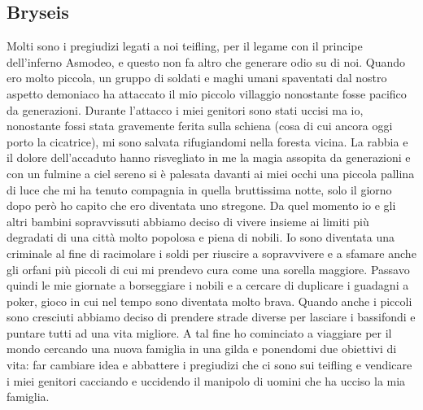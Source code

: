 \documentclass{article}
\begin{document}
          \subsection{Bryseis}Molti sono i pregiudizi legati a noi teifling, per il legame con il principe dell’inferno Asmodeo, e questo non fa altro che generare odio su di noi. Quando ero molto piccola, un gruppo di soldati e maghi umani spaventati dal nostro aspetto demoniaco ha attaccato il mio piccolo villaggio nonostante fosse pacifico da generazioni. Durante l’attacco i miei genitori sono stati uccisi ma io, nonostante fossi stata gravemente ferita sulla schiena (cosa di cui ancora oggi porto la cicatrice), mi sono salvata rifugiandomi nella foresta vicina. La rabbia e il dolore dell’accaduto hanno risvegliato in me la magia assopita da generazioni e con un fulmine a ciel sereno si è palesata davanti ai miei occhi una piccola pallina di luce che mi ha tenuto compagnia in quella bruttissima notte, solo il giorno dopo però ho capito che ero diventata uno stregone. Da quel momento io e gli altri bambini sopravvissuti abbiamo deciso di vivere insieme ai limiti più degradati di una città molto popolosa e piena di nobili. Io sono diventata una criminale al fine di racimolare i soldi per riuscire a sopravvivere e a sfamare anche gli orfani più piccoli di cui mi prendevo cura come una sorella maggiore. Passavo quindi le mie giornate a borseggiare i nobili e a cercare di duplicare i guadagni a poker, gioco in cui nel tempo sono diventata molto brava. Quando anche i piccoli sono cresciuti abbiamo deciso di prendere strade diverse per lasciare i bassifondi e puntare tutti ad una vita migliore. A tal fine ho cominciato a viaggiare per il mondo cercando una nuova famiglia in una gilda e ponendomi due obiettivi di vita: far cambiare idea e abbattere i pregiudizi che ci sono sui teifling e vendicare i miei genitori cacciando e uccidendo il manipolo di uomini che ha ucciso la mia famiglia. 
\end{document}
